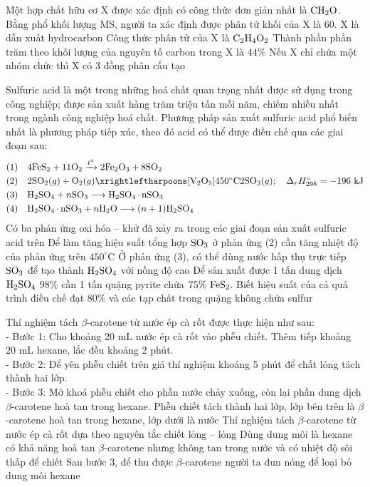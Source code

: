 \documentclass[11pt,a4paper]{article}
\begin{document}
\begin{ex}
Một hợp chất hữu cơ X được xác định có công thức đơn giản nhất là $\ce{CH2O}$. Bằng phổ khối lượng MS, người ta xác định được phân tử khối của X là 60.
\choiceTF
{\True X là dẫn xuất hydrocarbon}
{\True Công thức phân tử của X là $\ce{C2H4O2}$}
{Thành phần phần trăm theo khối lượng của nguyên tố carbon trong X là $44\%$}
{Nếu X chỉ chứa một nhóm chức thì X có 3 đồng phân cấu tạo}
\end{ex}
\begin{ex}
Sulfuric acid là một trong những hoá chất quan trọng nhất được sử dụng trong công nghiệp; được sản xuất hàng trăm triệu tấn mỗi năm, chiếm nhiều nhất trong ngành công nghiệp hoá chất. Phương pháp sản xuất sulfuric acid phổ biến nhất là phương pháp tiếp xúc, theo đó acid có thể được điều chế qua các giai đoạn sau:
\begin{align*}
(1) &\quad 4\ce{FeS2} + 11\ce{O2} \xrightarrow{t^\circ} 2\ce{Fe2O3} + 8\ce{SO2} \\
(2) &\quad 2\ce{SO2}(g) + \ce{O2}(g) \xrightleftharpoons[\text{V}_2\text{O}_5]{450^\circ\text{C}} 2\ce{SO3}(g);\quad \Delta_r H^\circ_{298} = -196\text{ kJ} \\
(3) &\quad \ce{H2SO4} + n\ce{SO3} \longrightarrow \ce{H2SO4.nSO3} \\
(4) &\quad \ce{H2SO4.nSO3} + n\ce{H2O} \longrightarrow (n+1)\ce{H2SO4}
\end{align*}
\choiceTF
{Có ba phản ứng oxi hóa – khử đã xảy ra trong các giai đoạn sản xuất sulfuric acid trên}
{Để làm tăng hiệu suất tổng hợp $\ce{SO3}$ ở phản ứng (2) cần tăng nhiệt độ của phản ứng trên $450^\circ\text{C}$}
{Ở phản ứng (3), có thể dùng nước hấp thụ trực tiếp $\ce{SO3}$ để tạo thành $\ce{H2SO4}$ với nồng độ cao}
{\True Để sản xuất được 1 tấn dung dịch $\ce{H2SO4}$ $98\%$ cần 1 tấn quặng pyrite chứa $75\%\ \ce{FeS2}$. Biết hiệu suất của cả quá trình điều chế đạt $80\%$ và các tạp chất trong quặng không chứa sulfur}
\end{ex}
\begin{ex}
Thí nghiệm tách $\beta$-carotene từ nước ép cà rốt được thực hiện như sau:\\
- Bước 1: Cho khoảng $20\text{ mL}$ nước ép cà rốt vào phễu chiết. Thêm tiếp khoảng $20\text{ mL}$ hexane, lắc đều khoảng 2 phút.\\
- Bước 2: Để yên phễu chiết trên giá thí nghiệm khoảng 5 phút để chất lỏng tách thành hai lớp.\\
- Bước 3: Mở khoá phễu chiết cho phần nước chảy xuống, còn lại phần dung dịch $\beta$-carotene hoà tan trong hexane.
\choiceTF
{\True Phễu chiết tách thành hai lớp, lớp bên trên là $\beta$-carotene hoà tan trong hexane, lớp dưới là nước}
{\True Thí nghiệm tách $\beta$-carotene từ nước ép cà rốt dựa theo nguyên tắc chiết lỏng – lỏng}
{\True Dùng dung môi là hexane có khả năng hoà tan $\beta$-carotene nhưng không tan trong nước và có nhiệt độ sôi thấp để chiết}
{\True Sau bước 3, để thu được $\beta$-carotene người ta đun nóng để loại bỏ dung môi hexane}
\end{ex}
\end{document}
